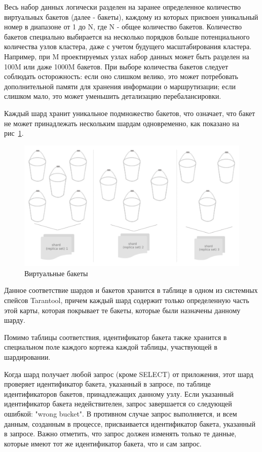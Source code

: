 Весь набор данных логически разделен на заранее определенное количество
виртуальных бакетов (далее - бакеты), каждому из которых присвоен уникальный
номер в диапазоне от 1 до N, где N - общее количество бакетов. Количество
бакетов специально выбирается на несколько порядков больше потенциального
количества узлов кластера, даже с учетом будущего масштабирования кластера.
Например, при M проектируемых узлах набор данных может быть разделен на 100M
или даже 1000M бакетов. При выборе количества бакетов следует соблюдать
осторожность: если оно слишком велико, это может потребовать дополнительной
памяти для хранения информации о маршрутизации; если слишком мало, это может
уменьшить детализацию перебалансировки.

Каждый шард хранит уникальное подмножество бакетов, что означает, что бакет не
может принадлежать нескольким шардам одновременно, как показано на
рис~\ref{fig:fig03}.

\begin{figure}
  \centering
  \includegraphics[scale=0.7]{inc/bucket.png}
    \caption{Виртуальные бакеты \cite{VshardDoc}}
  \label{fig:fig03}
\end{figure}

Данное соответствие шардов и бакетов хранится в таблице в одном из системных
спейсов Tarantool, причем каждый шард содержит только определенную часть этой
карты, которая покрывает те бакеты, которые были назначены данному шарду.

Помимо таблицы соответствия, идентификатор бакета также хранится в специальном
поле каждого кортежа каждой таблицы, участвующей в шардировании.

Когда шард получает любой запрос (кроме SELECT) от приложения, этот шард
проверяет идентификатор бакета, указанный в запросе, по таблице идентификаторов
бакетов, принадлежащих данному узлу. Если указанный идентификатор бакета
недействителен, запрос завершается со следующей ошибкой: "wrong bucket". В
противном случае запрос выполняется, и всем данным, созданным в процессе,
присваивается идентификатор бакета, указанный в запросе. Важно отметить, что
запрос должен изменять только те данные, которые имеют тот же идентификатор
бакета, что и сам запрос.

